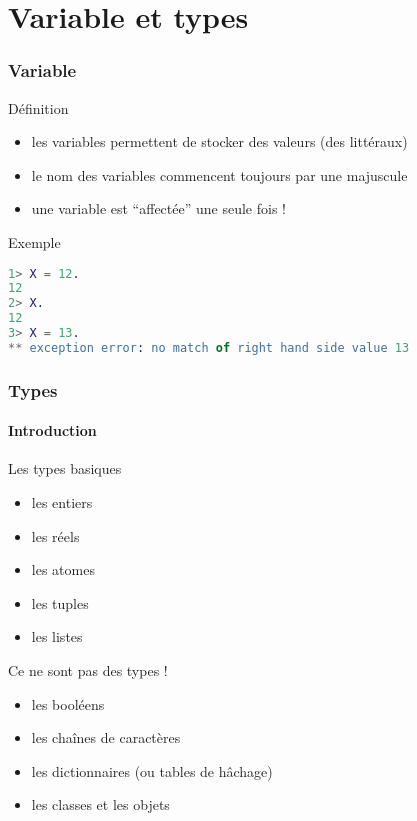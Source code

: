 \section{Variable et types}

\begin{frame}[fragile]
  \frametitle{Variable}

  \begin{block}{Définition}
    \begin{itemize}
    \item les variables permettent de stocker des valeurs (des littéraux)
    \item le nom des variables commencent toujours par une majuscule
    \item une variable est ``affectée'' une seule fois !
    \end{itemize}
  \end{block}

  \begin{exampleblock}{Exemple}
    \begin{lstlisting}[language=erlang]
1> X = 12.
12
2> X.
12
3> X = 13.
** exception error: no match of right hand side value 13
    \end{lstlisting}
  \end{exampleblock}

\end{frame}

\begin{frame}
  \frametitle{Types}
  \framesubtitle{Introduction}

  \begin{block}{Les types basiques}
    \begin{itemize}
    \item les entiers
    \item les réels
    \item les atomes
    \item les tuples
    \item les listes
    \end{itemize}
  \end{block}

  \begin{alertblock}{Ce ne sont pas des types !}
    \begin{itemize}
    \item les booléens
    \item les chaînes de caractères
    \item les dictionnaires (ou tables de hâchage)
    \item les classes et les objets
    \end{itemize}
  \end{alertblock}

\end{frame}

